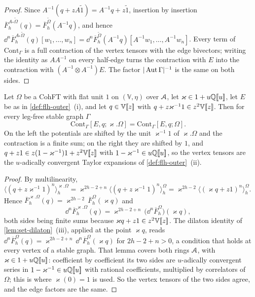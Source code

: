 \begin{proof}
Since $A^{-1}(q+zA\tilde1)=A^{-1}q+z\tilde1$, insertion by insertion $\overline F^{A_*\widetilde\Omega}_h(q)=\overline F^{\widetilde\Omega}_h(A^{-1}q)$, and hence $\dd^n\overline F^{A_*\widetilde\Omega}_h(q)[w_1,\dots,w_n]=\dd^n\overline F^{\widetilde\Omega}_h(A^{-1}q)[A^{-1}w_1,\dots,A^{-1}w_n]$. Every term of $\mathrm{Cont}_\Gamma$ is a full contraction of the vertex tensors with the edge bivectors; writing the identity as $AA^{-1}$ on every half-edge turns the contraction with $E$ into the contraction with $(A^{-1}\otimes A^{-1})E$. The factor $|\operatorname{Aut}\Gamma|^{-1}$ is the same on both sides.
\end{proof}

\begin{lem}
\label{lem:flh-dil}
Let $\Omega$ be a CohFT with flat unit $1$ on $(\mathbb V,\eta)$ over $\mathcal{A}$, let $\varkappa\in 1+u\mathbb{Q}[\![ u ]\!]$, let $E$ be as in \cref{def:flh-outer}~(i), and let $q\in\mathbb V[\![ z ]\!]$ with $q+z\varkappa^{-1}1\in z^2\mathbb V[\![ z ]\!]$. Then for every leg-free stable graph $\Gamma$
\[
\mathrm{Cont}_\Gamma[E,q;\varkappa.\Omega]=\mathrm{Cont}_\Gamma[E,q;\Omega].
\]
On the left the potentials are shifted by the unit $\varkappa^{-1}1$ of $\varkappa.\Omega$ and the contraction is a finite sum; on the right they are shifted by $1$, and $q+z1\in z(1-\varkappa^{-1})1+z^2\mathbb V[\![ z ]\!]$ with $1-\varkappa^{-1}\in u\mathbb{Q}[\![ u ]\!]$, so the vertex tensors are the $u$-adically convergent Taylor expansions of \cref{def:flh-outer}~(ii).
\end{lem}

\begin{proof}
By multilinearity, $\langle(q+z\varkappa^{-1}1)^n\rangle^{\varkappa.\Omega}_h=\varkappa^{2h-2+n}\langle(q+z\varkappa^{-1}1)^n\rangle^{\Omega}_h=\varkappa^{2h-2}\langle(\varkappa q+z1)^n\rangle^{\Omega}_h$. Hence $\overline F^{\varkappa.\Omega}_h(q)=\varkappa^{2h-2}\,\overline F^{\Omega}_h(\varkappa q)$ and
\[
\dd^n\overline F^{\varkappa.\Omega}_h(q)=\varkappa^{2h-2+n}\,\bigl(\dd^n\overline F^{\Omega}_h\bigr)(\varkappa q),
\]
both sides being finite sums because $\varkappa q+z1\in z^2\mathbb V[\![ z ]\!]$. The dilaton identity of \cref{lem:set-dilaton}~(iii), applied at the point $\varkappa q$, reads $\dd^n\overline F^{\Omega}_h(q)=\varkappa^{2h-2+n}\,\dd^n\overline F^{\Omega}_h(\varkappa q)$ for $2h-2+n>0$, a condition that holds at every vertex of a stable graph. That lemma covers both rings $\mathcal{A}$, with $\varkappa\in1+u\mathbb{Q}[\![ u ]\!]$: coefficient by coefficient its two sides are $u$-adically convergent series in $1-\varkappa^{-1}\in u\mathbb{Q}[\![ u ]\!]$ with rational coefficients, multiplied by correlators of $\Omega$; this is where $\varkappa(0)=1$ is used. So the vertex tensors of the two sides agree, and the edge factors are the same.
\end{proof}

